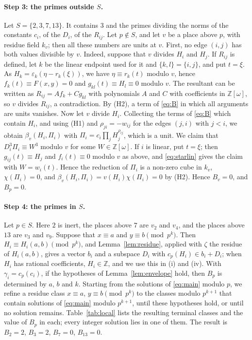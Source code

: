 \documentclass[11pt]{article}
\newcommand{\Z}{\mathbb{Z}}
\begin{document}
\paragraph{Step 3: the primes outside $S$.} Let $S=\{2,3,7,13\}$. It contains $3$ and the primes dividing the norms of the constants $c_i$, of the $D_i$, of the $R_{ij}$. Let $p\notin S$, and let $v$ be a place above $p$, with residue field $k_v$; then all these numbers are units at $v$. First, no edge $(i,j)$ has both values divisible by $v$. Indeed, suppose that $v$ divides $H_i$ and $H_j$. If $R_{ij}$ is defined, let $k$ be the linear endpoint used for it and $\{k,l\}=\{i,j\}$, and put $t=\xi$. As $H_k=\varepsilon_k(\eta-r_k(\xi))$, we have $\eta\equiv r_k(t)$ modulo $v$, hence $f_k(t)\equiv F(x,y)=0$ and $g_{kl}(t)\equiv H_l\equiv0$ modulo $v$. The resultant can be written as $R_{ij}=Af_k+Cg_{kl}$ with polynomials $A$ and $C$ with coefficients in $\Z[\omega]$, so $v$ divides $R_{ij}$, a contradiction. By (H2), a term of \eqref{eq:B} in which all arguments are units vanishes. Now let $v$ divide $H_i$. Collecting the terms of \eqref{eq:B} which contain $H_i$, and using (H1) and $\rho_{ji}=-w_{ij}$ for the edges $(j,i)$ with $j<i$, we obtain $\beta_v(H_i,\Pi_i)$ with $\Pi_i=c_i\prod_jH_j^{\rho_{ij}}$, which is a unit. We claim that $D_i^3\Pi_i\equiv W^3$ modulo $v$ for some $W\in\Z[\omega]$. If $i$ is linear, put $t=\xi$; then $g_{ij}(t)\equiv H_j$ and $f_i(t)\equiv0$ modulo $v$ as above, and \eqref{eq:starlin} gives the claim with $W=w_i(t)$. Hence the reduction of $\Pi_i$ is a non-zero cube in $k_v$, $\chi(\Pi_i)=0$, and $\beta_v(H_i,\Pi_i)=v(H_i)\chi(\Pi_i)=0$ by (H2). Hence $B_v=0$, and $B_p=0$.

\paragraph{Step 4: the primes in $S$.} Let $p\in S$. Here $2$ is inert, the places above $7$ are $v_{2}$ and $v_{4}$, and the places above $13$ are $v_{3}$ and $v_{9}$. Suppose that $x\equiv a$ and $y\equiv b\pmod{p^k}$. Then $H_i\equiv H_i(a,b)\pmod{p^k}$, and Lemma~\ref{lem:residue}, applied with $\zeta$ the residue of $H_i(a,b)$, gives a vector $b_i$ and a subspace $D_i$ with $c_p(H_i)\in b_i+D_i$; when $H_i$ has rational coefficients, $H_i\in\Z$, and we use this in (i) and (iv). With $\gamma_i=c_p(c_i)$, if the hypotheses of Lemma~\ref{lem:envelope} hold, then $B_p$ is determined by $a$, $b$ and $k$. Starting from the solutions of \eqref{eq:main} modulo $p$, we refine a residue class $x\equiv a$, $y\equiv b\pmod{p^k}$ to the classes modulo $p^{k+1}$ that contain solutions of \eqref{eq:main} modulo $p^{k+1}$, until these hypotheses hold, or until no solution remains. Table~\ref{tab:local} lists the resulting terminal classes and the value of $B_p$ in each; every integer solution lies in one of them. The result is $B_{2}=2$, $B_{3}=2$, $B_{7}=0$, $B_{13}=0$.
\end{document}
